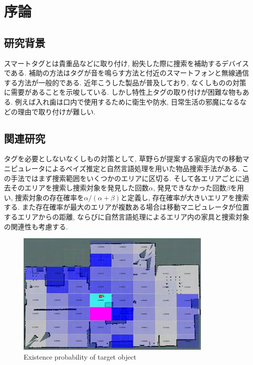 \chapter{序論}

\section{研究背景}
スマートタグとは貴重品などに取り付け, 紛失した際に捜索を補助するデバイスである. 
補助の方法はタグが音を鳴らす方法と付近のスマートフォンと無線通信する方法が一般的である. 
近年こうした製品が普及しており, なくしものの対策に需要があることを示唆している. 
しかし特性上タグの取り付けが困難な物もある. 
例えば入れ歯は口内で使用するために衛生や防水, 日常生活の邪魔になるなどの理由で取り付けが難しい. 

\section{関連研究}
タグを必要としないなくしもの対策として, 草野らが提案する家庭内での移動マニピュレータによるベイズ推定と自然言語処理を用いた物品捜索手法がある. \cite{kusano}
この手法ではまず捜索範囲をいくつかのエリアに区切る. 
そして各エリアごとに過去そのエリアを捜索し捜索対象を発見した回数$\alpha$, 発見できなかった回数$\beta$を用い, 
捜索対象の存在確率を$ \alpha / (\alpha + \beta)$と定義し, 存在確率が大きいエリアを捜索する. 
また存在確率が最大のエリアが複数ある場合は移動マニピュレータが位置するエリアからの距離, ならびに自然言語処理によるエリア内の家具と捜索対象の関連性も考慮する. 

\begin{figure}[H]
    \begin{center}
        \includegraphics[width=0.8\linewidth]{figs/kusano.jpg}
        \caption{Existence probability of target object}
        \label{fig:kusano}
    \end{center}
\end{figure}

